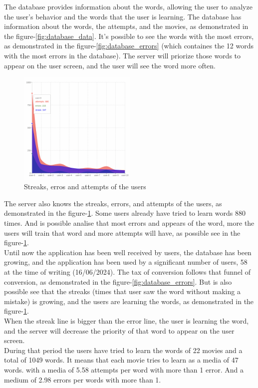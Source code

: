 \documentclass[12pt]{article}
\begin{document}
The database provides information about the words, allowing the user to analyze the user's behavior and the words that the user is learning. The database has information about the words, the attempts, and the movies, as demonstrated in the figure-\ref{fig:database_data}. 
It's possible to see the words with the most errors, as demonstrated in the figure-\ref{fig:database_errors} (which containes the 12 words with the most errors in the database). The server will priorize those words to appear on the user screen, and the user will see the word more often. 
\begin{figure}[!h]
  \centering
  \caption{
  Streaks, erros and attempts of the users
  }
  \label{fig:database_users}
  \includegraphics[width=0.50\textwidth]{assets/31.png}
\end{figure}
The server also knows the streaks, errors, and attempts of the users, as demonstrated in the figure-\ref{fig:database_users}. Some users already have tried to learn words 880 times. And is possible analise that 
most errors and appears of the word, more the users will train that word and more attempts will have, as possible see in the figure-\ref{fig:database_users}. \\
Until now the application has been well received by users, the database has been growing, and the application has been used by a significant number of users, 58 at the time of writing (16/06/2024). The tax of conversion follows that funnel of conversion, as demonstrated in the figure-\ref{fig:database_errors}. 
But is also possible see that the streaks (times that user saw the word without making a mistake) is growing, and the users are learning the words, as demonstrated in the figure-\ref{fig:database_users}. \\
When the streak line is bigger than the error line, the user is learning the word, and the server will decrease the priority of that word to appear on the user screen. \\
During that period the users have tried to learn the words of 22 movies and a total of 1049 words. It means that each movie tries to learn as a media of 47 words. with a media of 5.58 attempts per word with more than 1 error. And a medium of 2.98 errors per words with more than 1. \\
\end{document}
